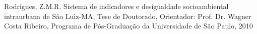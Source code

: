 \documentclass[
12pt,		%
openright,	%
twoside,  %
a4paper,			%
chapter=TITLE,		%
english,			%
french,				%
spanish,			%
brazil				%
]{USPSC-classe/USPSC}
\begin{document}
\begin{flushleft}
\begin{flushleft}
\begin{flushleft}
\begin{flushleft}
\begin{flushleft}
\begin{flushleft}
\begin{flushleft}
\begin{flushleft}
\begin{flushleft}
\begin{flushleft}
[Rodrigues, 2010] Rodrigues, Z.M.R. Sistema de indicadores e desigualdade socioambiental intraurbana de S\~ao Lu\'{\i}z-MA, Tese de Doutorado, Orientador: Prof. Dr. Wagner Costa Ribeiro, Programa de P\'os-Gradua\c{c}\~ao da Universidade de S\~ao Paulo, 2010
\end{flushleft}


\end{flushleft}


\end{flushleft}


\end{flushleft}


\end{flushleft}


\end{flushleft}


\end{flushleft}


\end{flushleft}


\end{flushleft}


\end{flushleft}
\end{document}
